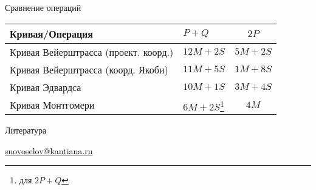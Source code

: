 \documentclass{beamer}
\begin{document}
\begin{frame}{Сравнение операций}
\begin{table}[]
    \begin{tabular}{l|lc}
     Кривая/Операция   & $P + Q$ & $2 P$  \\
        \hline
     Кривая Вейерштрасса (проект. коорд.)  & $12 M + 2 S$ & $5M + 2 S$ \\
     Кривая Вейерштрасса (коорд. Якоби)  & $11 M + 5 S$ & $1M + 8 S$ \\
     Кривая Эдвардса  & $10 M + 1 S$  & $3M + 4 S$ \\
     Кривая Монтгомери & $6M + 2 S$\footnote{ для $2P + Q$} & $4M$
    \end{tabular}
\end{table}

\end{frame}



\begin{frame}{Литература}
    \nocite{CohenFrey+2005}
    \nocite{Galbraith2012}
    \nocite{SafeCurves}
    \printbibliography
    
    \begin{center}
        \begin{tcolorbox}[enhanced,hbox,colback=block-green-color-bg,colframe=subsection-color!120,title=Контакты,center title]
            \begin{varwidth}{\textwidth}
                \begin{center}
                    \href{mailto:snovoselov@kantiana.ru}{snovoselov@kantiana.ru}
                \end{center}
            \end{varwidth}
        \end{tcolorbox}	
    \end{center}\end{frame}
\end{document}
